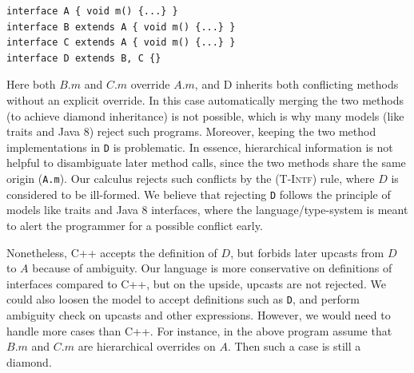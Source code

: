 \vspace{3pt}\begin{lstlisting}
interface A { void m() {...} }
interface B extends A { void m() {...} }
interface C extends A { void m() {...} }
interface D extends B, C {}
\end{lstlisting}\vspace{3pt}
Here both $B.m$ and $C.m$ override $A.m$, and D inherits
both conflicting methods without an explicit override. In this case automatically merging 
the two methods (to achieve diamond inheritance) is not possible, which is why many 
models (like traits and Java 8) reject such programs. Moreover, keeping the two 
method implementations in \lstinline|D| is problematic. 
In essence, hierarchical information is 
not helpful to disambiguate later method calls, since the two methods share 
the same origin (\lstinline|A.m|). 
Our calculus rejects such conflicts by the \textsc{(T-Intf)} rule, where $D$ is considered to be ill-formed. 
We believe that rejecting \lstinline|D| follows the principle of models like traits and Java 8 interfaces, 
where the language/type-system is meant to alert the programmer for a possible conflict early.

Nonetheless,
 C++ accepts the definition of $D$, but forbids later upcasts from $D$ to $A$ because of ambiguity. Our language is more conservative on definitions of interfaces compared to C++, but on the upside, upcasts are not rejected. We could also loosen the model to accept definitions such as \lstinline|D|, and perform ambiguity check on upcasts and other expressions. However, we would need to handle more cases than C++. For instance, in the above program assume that $B.m$ and $C.m$ are hierarchical overrides on $A$. Then such a case is still a diamond.

